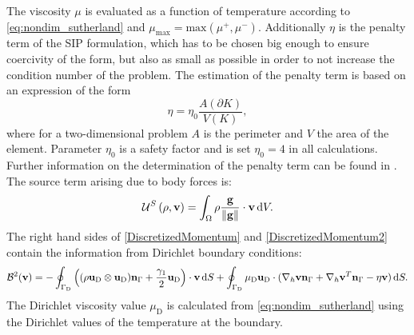 The viscosity $\mu$ is evaluated as a function of temperature according to \cref{eq:nondim_sutherland} and $\mu_{\text{max}} = \text{max}(\mu^{+}, \mu^{-})$.  Additionally  $\eta$ is the penalty term of the SIP formulation, which has to be chosen big enough to ensure coercivity of the form, but also as small as possible in order to not increase the condition number of the problem. The estimation of the penalty term is based on an expression of the form
\begin{equation}
	\eta = \eta_0 \frac{A(\partial K)}{V(K)},
\end{equation}
where for a two-dimensional problem $A$ is the perimeter and $V$ the area of the element. Parameter $\eta_0$ is a safety factor and is set $\eta_0 = 4$ in all calculations. Further information on the determination of the penalty term can be found in  \cite{hillewaertDevelopmentDiscontinuousGalerkin2013b}.
The source term arising due to body forces is:
\begin{equation}
	\mathcal{U}^S\left(\rho, \textbf{v}\right) =  \int_{\Omega}{  \rho \frac{\textbf{g}}{\Vert \textbf{g} \Vert}\cdot \textbf{v}} \,\mathrm{d} V.  \label{eq:Mom_source}
\end{equation}
The right hand sides of \cref{DiscretizedMomentum} and \cref{DiscretizedMomentum2} contain the information from Dirichlet boundary conditions:
\begin{equation}
	\mathcal{B}^2(\textbf{v}) =
	-\oint_{\Gamma_{\text{D}}}{ \left( (\rho\textbf{u}_{\text{D}}\otimes\textbf{u}_{\text{D}} )\textbf{n}_{\Gamma} + \frac{\gamma_1}{2}\textbf{u}_{\text{D}}\right)\cdot\textbf{v} \,\mathrm{d} S}  +
	\oint_{\Gamma_{\text{D}}}{\mu_{\text{D}}\textbf{u}_{\text{D}}\cdot(\nabla_h\textbf{v} \textbf{n}_{\Gamma} + \nabla_h\textbf{v}^T \textbf{n}_{\Gamma}- \eta \textbf{v} )\,\mathrm{d} S.}
\end{equation}
The Dirichlet viscosity value $\mu_{\text{D}}$ is calculated from \cref{eq:nondim_sutherland} using the Dirichlet values of the temperature at the boundary.
